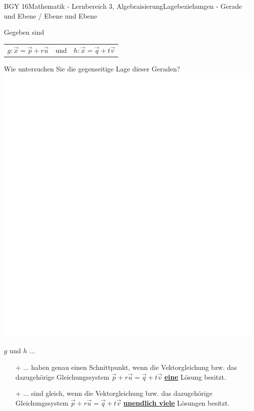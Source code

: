 \documentclass[oneside,openany,headings=optiontotoc,11pt,numbers=noenddot]{scrreprt}
\begin{document}
	\begin{worksheet}{BGY 16}{Mathematik - Lernbereich 3, Algebraisierung}{Lagebeziehungen - Gerade und Ebene / Ebene und Ebene}
		\begin{framed}
			\noindent
			Gegeben sind
			\begin{tabularx}{\textwidth}{lcl}
				\colorbox{blue!5}{\(g: \vec{x} = \vec{p} + r\vec{u}\)} & und & \colorbox{blue!5}{\(h: \vec{x} = \vec{q} + t\vec{v}\)}
			\end{tabularx}
			Wie untersuchen Sie die gegenseitige Lage dieser Geraden?\\
			\includegraphics[scale=0.15]{../empty.jpg}
		\end{framed}
		\begin{framed}
			\noindent
			\(g\) und \(h\) \(\ldots\)
			\begin{itemize}
				\item[+] \(\ldots\) haben \color{codegreen}genau einen\normalcolor{} Schnittpunkt, wenn die Vektorgleichung bzw. das dazugehörige Gleichungssystem \(\vec{p} + r\vec{u} = \vec{q} + t\vec{v}\) \underline{\textbf{eine}} Lösung besitzt. 
				\item[+] \(\ldots\) sind \color{codegreen}gleich\normalcolor{}, wenn die Vektorgleichung bzw. das dazugehörige Gleichungssystem \(\vec{p} + r\vec{u} = \vec{q} + t\vec{v}\) \underline{\textbf{unendlich viele}} Lösungen besitzt.

\end{itemize}
\end{framed}
\end{worksheet}
\end{document}
